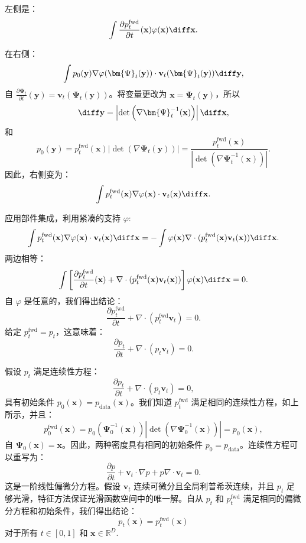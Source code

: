 左侧是：
\[
\int \frac{\partial p_t^{\mathrm{fwd}}}{\partial t}(\mathbf{x}) \varphi(\mathbf{x}) \diff\mathbf{x}.
\]

在右侧：
\[
\int p_0(\mathbf{y}) \nabla \varphi(\bm{\Psi}_t(\mathbf{y})) \cdot \mathbf{v}_t(\bm{\Psi}_t(\mathbf{y})) \diff\mathbf{y},
\]
自 $ \frac{\partial \bm{\Psi}_t}{\partial t}(\mathbf{y}) = \mathbf{v}_t(\bm{\Psi}_t(\mathbf{y})) $。将变量更改为 $ \mathbf{x} = \bm{\Psi}_t(\mathbf{y}) $，所以
\[
\diff\mathbf{y} = \left| \det\left( \nabla \bm{\Psi}_t^{-1}(\mathbf{x}) \right) \right| \diff\mathbf{x} ,
\]
 和
\[
p_0(\mathbf{y}) = p_t^{\mathrm{fwd}}(\mathbf{x}) \left| \det\left( \nabla \bm{\Psi}_t(\mathbf{y}) \right) \right| = \frac{p_t^{\mathrm{fwd}}(\mathbf{x})}{\left| \det\left( \nabla \bm{\Psi}_t^{-1}(\mathbf{x}) \right) \right|}.
\]
因此，右侧变为：
\[
\int p_t^{\mathrm{fwd}}(\mathbf{x}) \nabla \varphi(\mathbf{x}) \cdot \mathbf{v}_t(\mathbf{x}) \diff\mathbf{x}.
\]

应用部件集成，利用紧凑的支持 $ \varphi $:
\[
\int p_t^{\mathrm{fwd}}(\mathbf{x}) \nabla \varphi(\mathbf{x}) \cdot \mathbf{v}_t(\mathbf{x}) \diff\mathbf{x} = -\int \varphi(\mathbf{x}) \nabla \cdot (p_t^{\mathrm{fwd}}(\mathbf{x}) \mathbf{v}_t(\mathbf{x})) \diff\mathbf{x}.
\]
两边相等：
\[
\int \left[ \frac{\partial p_t^{\mathrm{fwd}}}{\partial t}(\mathbf{x}) + \nabla \cdot (p_t^{\mathrm{fwd}}(\mathbf{x}) \mathbf{v}_t(\mathbf{x})) \right] \varphi(\mathbf{x}) \diff\mathbf{x} = 0.
\]
自 $ \varphi $ 是任意的，我们得出结论：
\[
\frac{\partial p_t^{\mathrm{fwd}}}{\partial t} + \nabla \cdot (p_t^{\mathrm{fwd}} \mathbf{v}_t) = 0.
\]
给定 $ p_t^{\mathrm{fwd}} = p_t $，这意味着：
\[
\frac{\partial p_t}{\partial t} + \nabla \cdot (p_t \mathbf{v}_t) = 0.
\]


 假设 $ p_t $ 满足连续性方程：
\[
\frac{\partial p_t}{\partial t} + \nabla \cdot (p_t \mathbf{v}_t) = 0,
\]
具有初始条件 $ p_0(\mathbf{x}) = p_{\mathrm{data}}(\mathbf{x}) $。我们知道 $ p_t^{\mathrm{fwd}} $ 满足相同的连续性方程，如上所示，并且：
\[
p_0^{\mathrm{fwd}}(\mathbf{x}) = p_0(\bm{\Psi}_0^{-1}(\mathbf{x})) \left| \det\left( \nabla \bm{\Psi}_0^{-1}(\mathbf{x}) \right) \right| = p_0(\mathbf{x}),
\]
自 $ \bm{\Psi}_0(\mathbf{x}) = \mathbf{x} $。因此，两种密度具有相同的初始条件 $ p_0 = p_{\mathrm{data}} $。连续性方程可以重写为：
\[
\frac{\partial p}{\partial t} + \mathbf{v}_t \cdot \nabla p + p \nabla \cdot \mathbf{v}_t = 0.
\]
这是一阶线性偏微分方程。假设 $ \mathbf{v}_t $ 连续可微分且全局利普希茨连续，并且 $ p_t $ 足够光滑，特征方法保证光滑函数空间中的唯一解。自从 $ p_t $ 和 $ p_t^{\mathrm{fwd}} $ 满足相同的偏微分方程和初始条件，我们得出结论：
\[
p_t(\mathbf{x}) = p_t^{\mathrm{fwd}}(\mathbf{x})
\]
对于所有 $t\in[0,1]$ 和 $\mathbf{x} \in \mathbb{R}^D$.

